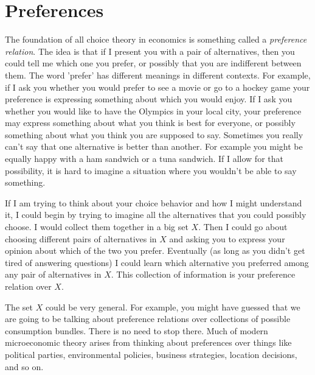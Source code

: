 \documentclass[12pt]{article}
\begin{document}
\section{Preferences}

The foundation of all choice theory in economics is something called a
\emph{preference relation}. The idea is that if I present you with a pair of
alternatives, then you could tell me which one you prefer, or possibly that
you are indifferent between them. The word 'prefer' has different meanings in
different contexts. For example, if I ask you whether you would prefer to see
a movie or go to a hockey game your preference is expressing something about
which you would enjoy. If I ask you whether you would like to have the
Olympics in your local city, your preference may express something about what
you think is best for everyone, or possibly something about what you think you
are supposed to say. Sometimes you really can't say that one alternative is
better than another. For example you might be equally happy with a ham
sandwich or a tuna sandwich. If I allow for that possibility, it is hard to
imagine a situation where you wouldn't be able to say something.

If I am trying to think about your choice behavior and how I might understand
it, I could begin by trying to imagine all the alternatives that you could
possibly choose. I would collect them together in a big set $X$. Then I could
go about choosing different pairs of alternatives in $X$ and asking you to
express your opinion about which of the two you prefer. Eventually (as long as
you didn't get tired of answering questions) I could learn which alternative
you preferred among any pair of alternatives in $X$. This collection of
information is your preference relation over $X$.

The set $X$ could be very general. For example, you might have guessed that we
are going to be talking about preference relations over collections of
possible consumption bundles. There is no need to stop there. Much of modern
microeconomic theory arises from thinking about preferences over things like
political parties, environmental policies, business strategies, location
decisions, and so on.
\end{document}
